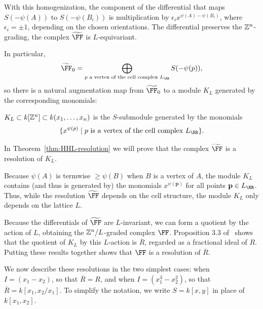 \documentclass{amsart}
\begin{document}
With this homogenization, the component of the differential that maps $S(-\psi(A))$ to $S(-\psi(B_{i}))$ is multiplication by $\epsilon_{i}x^{\psi(A) - \psi(B_{i})}$, where
$\epsilon_{i} = \pm 1$, depending on the chosen orientations. The
differential preserves the $\mathbb Z^{n}$-grading, the complex $\tF$ is $L$-equivariant.



In particular,
$$
\tF_{0} = \bigoplus_{p \text{ a vertex of the cell complex }L_{\RR}}S(-\psi(p)),
$$
so there is a natural augmentation map from $\tF_{0}$ to a module $K_{L}$ generated by the corresponding monomials:

\begin{defn}\label{def:M_{L}}
 $K_{L}\subset k[\mathbb Z^{n}]\subset k(x_{1}, \dots, x_{n})$ is the $S$-submodule generated by the monomials
 $$
 \{x^{\psi(p)} \mid p \hbox{ is a vertex of the cell complex }L_{\RR}\}.
 $$
\end{defn}


In Theorem~\ref{thm:HHL-resolution} we will prove that the complex $\tF$ is a resolution of $K_L$.

\begin{remark}
 Because $\psi(A)$ is termwise $\geq \psi(B)$ when $B$ is a vertex of $A$, the module $K_{L}$ contains (and thus is generated by) the monomials $x^{\psi(\mathbf{p})}$ for all points $\mathbf{p}\in L_{\RR}$. Thus, while the resolution $\tF$ depends on the cell structure, the module $K_L$ only depends on the lattice $L$.
\end{remark}

Because the differentials of $\tF$ are $L$-invariant, we can form a quotient by the action of $L$, obtaining the $\mathbb Z^{n}/L$-graded complex $\FF$. Proposition 3.3 of~\cite{BCHS+25} shows  that the quotient of $K_L$ by this $L$-action is $\overline{R}$, regarded as a fractional ideal of $R$. Putting these results together shows that  $\FF$ is a resolution of $\overline R$.

We now describe these resolutions in the two simplest cases: when $I = (x_1-x_2)$, so that $\overline R = R$, and when $I = (x_1^3-x_2^2)$, so that $\overline R = k[x_1,x_2/x_1]$. 
To simplify the notation, we write $S =k[x,y]$ in place of $k[x_1,x_2]$.  
\end{document}
